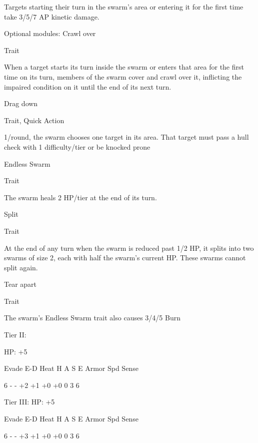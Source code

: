 Targets starting their turn in the swarm's area or entering it for the first time take 3/5/7 AP kinetic
damage.





Optional modules:
Crawl over

Trait

When a target starts its turn inside the swarm or enters that area for the first time on its turn,
members of the swarm cover and crawl over it, inflicting the impaired condition on it until the end
of its next turn.


Drag down

Trait, Quick Action

1/round, the swarm chooses one target in its area. That target must pass a hull check with 1
difficulty/tier or be knocked prone


Endless Swarm

Trait

The swarm heals 2 HP/tier at the end of its turn.


Split

Trait

At the end of any turn when the swarm is reduced past 1/2 HP, it splits into two swarms of size 2,
each with half the swarm's current HP. These swarms cannot split again.


Tear apart

Trait

The swarm's Endless Swarm trait also causes 3/4/5 Burn


Tier II:

HP: +5


          Evade     E-D     Heat    H     A     S     E        Armor        Spd       Sense

          6         -       -       +2    +1    +0    +0       0            3         6

Tier III:
HP: +5


          Evade     E-D     Heat    H     A     S     E        Armor        Spd       Sense

          6         -       -       +3    +1    +0    +0       0            3         6

